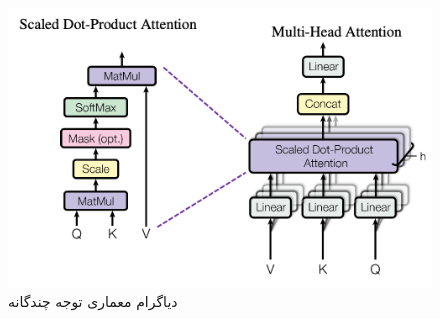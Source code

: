 \begin{figure}
	\centering
	\includegraphics[width=0.7\linewidth]{figs/mhattn1.png}
	\caption{دیاگرام معماری توجه چندگانه}
	\label{fig:mhattn1}
\end{figure}

%


%
%
%
%
%


